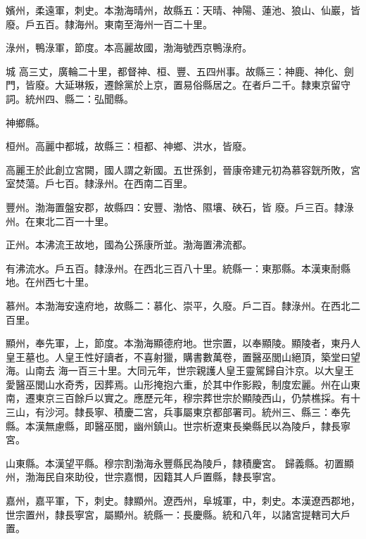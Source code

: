 \begin{pinyinscope}
 嬪州，柔遠軍，刺史。本渤海晴州，故縣五：天晴、神陽、蓮池、狼山、仙巖，皆廢。戶五百。隸海州。東南至海州一百二十里。



 淥州，鴨淥軍，節度。本高麗故國，渤海號西京鴨淥府。



 城
 高三丈，廣輪二十里，都督神、桓、豐、五四州事。故縣三：神鹿、神化、劍門，皆廢。大延琳叛，遷餘黨於上京，置易俗縣居之。在者戶二千。隸東京留守詞。統州四、縣二：弘聞縣。



 神鄉縣。



 桓州。高麗中都城，故縣三：桓都、神鄉、洪水，皆廢。



 高麗王於此創立宮闕，國人謂之新國。五世孫釗，晉康帝建元初為慕容皝所敗，宮室焚蕩。戶七百。隸淥州。在西南二百里。



 豐州。渤海置盤安郡，故縣四：安豐、渤恪、隰壤、硤石，皆
 廢。戶三百。隸淥州。在東北二百一十里。



 正州。本沸流王故地，國為公孫康所並。渤海置沸流都。



 有沸流水。戶五百。隸淥州。在西北三百八十里。統縣一：東那縣。本漢東耐縣地。在州西七十里。



 慕州。本渤海安遠府地，故縣二：慕化、崇平，久廢。戶二百。隸淥州。在西北二百里。



 顯州，奉先軍，上，節度。本渤海顯德府地。世宗置，以奉顯陵。顯陵者，東丹人皇王墓也。人皇王性好讀者，不喜射獵，購書數萬卷，置醫巫閭山絕頂，築堂曰望海。山南去
 海一百三十里。大同元年，世宗親護人皇王靈駕歸自汴京。以大皇王愛醫巫閭山水奇秀，因葬焉。山形掩抱六重，於其中作影殿，制度宏麗。州在山東南，遷東京三百餘戶以實之。應歷元年，穆宗葬世宗於顯陵西山，仍禁樵採。有十三山，有沙河。隸長寧、積慶二宮，兵事屬東京都部署司。統州三、縣三：奉先縣。本漢無慮縣，即醫巫閭，幽州鎮山。世宗析遼東長樂縣民以為陵戶，隸長寧宮。



 山東縣。本漢望平縣。穆宗割渤海永豐縣民為陵戶，隸積慶宮。
 歸義縣。初置顯州，渤海民自來助役，世宗嘉憫，因籍其人戶置縣，隸長寧宮。



 嘉州，嘉平軍，下，刺史。隸顯州。遼西州，阜城軍，中，刺史。本漢遼西郡地，世宗置州，隸長寧宮，屬顯州。統縣一：長慶縣。統和八年，以諸宮提轄司大戶置。




\end{pinyinscope}
